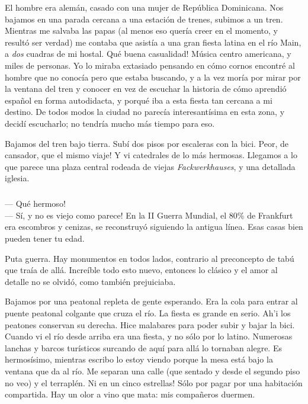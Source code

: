 El hombre era alem\'an, casado con una mujer de Rep\'ublica Dominicana. Nos
bajamos en una parada cercana a una estaci\'on de trenes, subimos a un tren.
Mientras me salvaba las papas (al menos eso quer\'ia creer en el momento, y
result\'o ser verdad) me contaba que asist\'ia a una gran fiesta latina en el
r\'io Main, a {\sl dos} cuadras de mi hostal. \textexclamdown Qu\'e buena
casualidad! M\'usica centro americana, y miles de personas. Yo lo miraba
extasiado pensando en c\'omo cornos encontr\'e al hombre que no conoc\'ia pero
que estaba buscando, y a la vez mor\'ia por mirar por la ventana del tren y
conocer en vez de escuchar la historia de c\'omo aprendi\'o espa\~nol en forma
autodidacta, y porqu\'e iba a esta fiesta tan cercana a mi destino. De todos
modos la ciudad no parec\'ia interesant\'isima en esta zona, y decid\'i
escucharlo; no tendr\'ia mucho m\'as tiempo para eso.

Bajamos del tren bajo tierra. Sub\'i dos pisos por escaleras con la bici.
\textexclamdown Peor, de cansador, que el mismo viaje! Y vi catedrales de lo
m\'as hermosas. Llegamos a lo que parece una plaza central rodeada de viejas
\emph{Fackwerkhauses}, y una detallada iglesia.

\subparagraph{}\label{ssub:Frankfurt} --- \textexclamdown Qu\'e hermoso!\\ ---
S\'i, \textexclamdown y no es viejo como parece! En la II Guerra Mundial, el
80\% de Frankfurt era escombros y cenizas, se reconstruy\'o siguiendo la
antigua l\'inea. Esas casas bien pueden tener tu edad.\\ \hangindent=1cm

Puta guerra. Hay monumentos en todos lados, contrario al preconcepto de tab\'u
que tra\'ia de all\'a. Incre\'ible todo esto nuevo, entonces lo cl\'asico y el
amor al detalle no se olvid\'o, como tambi\'en prejuiciaba.

Bajamos por una peatonal repleta de gente esperando. Era la cola para entrar al
puente peatonal colgante que cruza el r\'io. La fiesta es grande en serio. Ah'i
los peatones conservan su derecha. Hice malabares para poder subir y bajar la
bici. Cuando vi el r\'io desde arriba era una fiesta, y no s\'olo por lo latino.
Numerosas lanchas y barcos tur\'isticos surcando de aqu\'i para all\'a lo
tornaban alegre. Es hermos\'isimo, mientras escribo lo estoy viendo porque la
mesa est\'a bajo la ventana que da al r\'io. Me separan una calle (que sentado y
desde el segundo piso no veo) y el terrapl\'en. \textexclamdown Ni en un cinco
estrellas! S\'olo por pagar  por una habitaci\'on compartida.
Hay un olor a vino que mata: mis compa\~neros duermen.

